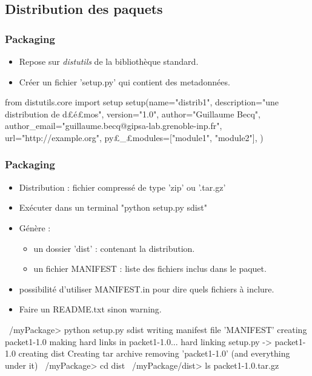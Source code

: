 \subsection{Distribution des paquets}
\begin{frame}[fragile]
\frametitle{Packaging}
\begin{itemize}
 \item Repose sur \emph{distutils} de la bibliothèque standard.
 \item Créer un fichier 'setup.py' qui contient des metadonnées. 
\end{itemize}
\begin{python}
from distutils.core import setup
setup(name="distrib1", 
    description="une distribution de d£{\color{magenta}é}£mos", 
    version="1.0", 
    author="Guillaume Becq", 
    author_email="guillaume.becq@gipsa-lab.grenoble-inp.fr", 
    url="http://example.org",
    py£\_£modules=["module1", "module2"], 
    )
\end{python}
\end{frame}
\begin{frame}[fragile]
\frametitle{Packaging}
\begin{itemize}
 \item Distribution : fichier compressé de type 'zip' ou '.tar.gz' 
 \item Exécuter dans un terminal "python setup.py sdist"
 \item Génère : 
 \begin{itemize}
  \item un dossier 'dist' : contenant la distribution.  
  \item un fichier MANIFEST : liste des fichiers inclus dans le paquet. 
 \end{itemize}
 \item possibilité d'utiliser MANIFEST.in pour dire quels fichiers à inclure.
 \item Faire un README.txt sinon warning.
\end{itemize}
\begin{shell}
~/myPackage> python setup.py sdist
writing manifest file 'MANIFEST'
creating packet1-1.0
making hard links in packet1-1.0...
hard linking setup.py -> packet1-1.0
creating dist
Creating tar archive
removing 'packet1-1.0' (and everything under it)
~/myPackage> cd dist
~/myPackage/dist> ls
packet1-1.0.tar.gz
\end{shell}
\end{frame}
